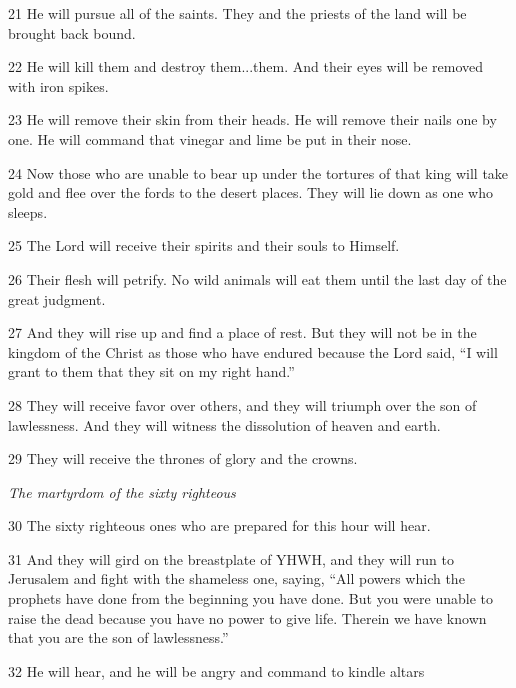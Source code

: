 \par 21 He will pursue all of the saints. They and the priests of the land will be brought back bound.

\par 22 He will kill them and destroy them...them. And their eyes will be removed with iron spikes.

\par 23 He will remove their skin from their heads. He will remove their nails one by one. He will command that vinegar and lime be put in their nose.

\par 24 Now those who are unable to bear up under the tortures of that king will take gold and flee over the fords to the desert places. They will lie down as one who sleeps.

\par 25 The Lord will receive their spirits and their souls to Himself.

\par 26 Their flesh will petrify. No wild animals will eat them until the last day of the great judgment.

\par 27 And they will rise up and find a place of rest. But they will not be in the kingdom of the Christ as those who have endured because the Lord said, “I will grant to them that they sit on my right hand.”

\par 28 They will receive favor over others, and they will triumph over the son of lawlessness. And they will witness the dissolution of heaven and earth.

\par 29 They will receive the thrones of glory and the crowns.


\par \textit{The martyrdom of the sixty righteous}


\par 30 The sixty righteous ones who are prepared for this hour will hear.

\par 31 And they will gird on the breastplate of YHWH, and they will run to Jerusalem and fight with the shameless one, saying, “All powers which the prophets have done from the beginning you have done. But you were unable to raise the dead because you have no power to give life. Therein we have known that you are the son of lawlessness.”

\par 32 He will hear, and he will be angry and command to kindle altars

